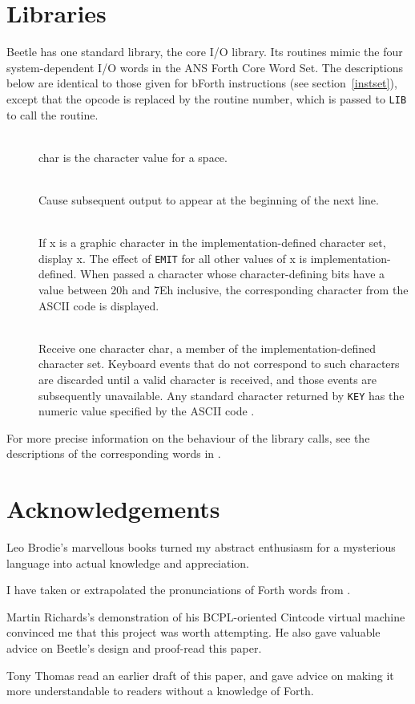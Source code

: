 \documentclass{article}
\newcommand{\spic}[1]{{\spfont \setlength{\baselineskip}{\normalbaselineskip} #1\/}}
\newlength{\itemwidth}\itemwidth=\textwidth \advance\itemwidth by -0.1in
\newlength{\instname}\instname=0.5in
\newlength{\pronunc}\pronunc=1.7in
\newlength{\opcode}\opcode=0.5in
\newlength{\stackcom}\stackcom=3.0in
\newcommand{\inst}[4]{\item[]\parbox{\itemwidth}%
{\makebox[\instname][l]{\tt #1}\makebox[\pronunc][r]{}\makebox[\opcode][r]%
{#2}\makebox[\stackcom][r]{\tt ( \spic{#3} )}\\[0.5ex]#4}}
\newcommand{\instp}[5]{\item[]\parbox{\itemwidth}%
{\makebox[\instname][l]{\tt #1}\makebox[\pronunc][r]{``#2''}%
\makebox[\opcode][r]{#3}\makebox[\stackcom][r]{\tt ( \spic{#4} )}\\[0.5ex]%
#5}}
\begin{document}
\section{Libraries}
\label{libraries}

Beetle has one standard library, the core I/O library. Its routines mimic the
four system-dependent I/O words in the ANS Forth Core Word Set. The descriptions
below are identical to those given for bForth instructions (see section~\ref{instset}),
except that the opcode is replaced by the routine number, which
is passed to {\tt LIB} to call the routine.

\begin{description}
\instp{BL}{b-l}{0}{-- char}{\spic{char} is the character value for a space.}
\instp{CR}{c-r}{1}{--}{Cause subsequent output to appear at the beginning of the next line.}
\inst{EMIT}{2}{x --}{If \spic{x} is a graphic character in the implementation-defined character set, display \spic{x}. The effect of {\tt EMIT} for all other values of \spic{x} is implementation-defined. When passed a character whose character-defining bits have a value between 20h and 7Eh inclusive, the corresponding character from the ASCII code \cite{ASCII} is displayed.}
\inst{KEY}{3}{-- char}{Receive one character \spic{char}, a member of the implementation-defined character set. Keyboard events that do not correspond to such characters are discarded until a valid character is received, and those events are subsequently unavailable. Any standard character returned by {\tt KEY} has the numeric value specified by the ASCII code \cite{ASCII}.}
\end{description}

For more precise information on the behaviour of the library calls, see the
descriptions of the corresponding words in \cite[chapter 6]{ANSIforth}.


\section*{Acknowledgements}

Leo Brodie's marvellous books \cite{starting4th,thinking4th} turned my abstract
enthusiasm for a mysterious language into actual knowledge and appreciation.

I have taken or extrapolated the pronunciations of Forth words from \cite{ANSIforth}.

Martin Richards's demonstration of his BCPL-oriented Cintcode virtual machine
convinced me that this project was worth attempting. He also gave valuable
advice on Beetle's design and proof-read this paper.

Tony Thomas read an earlier draft of this paper, and gave advice on making it
more understandable to readers without a knowledge of Forth.




\end{document}
